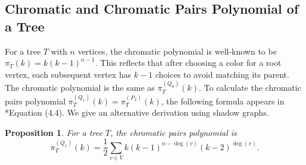 \documentclass[12pt,reqno,dvipsnames]{amsart}
\newtheorem{prop}[theorem]{Proposition}
\theoremstyle{definition}
\begin{document}
\subsection{Chromatic and Chromatic Pairs Polynomial of a Tree}

For a tree $T$ with $n$ vertices, the chromatic polynomial is well-known to be $\pi_T(k) = k(k - 1)^{n - 1}$. This reflects that after choosing a color for a root vertex, each subsequent vertex has $k - 1$ choices to avoid matching its parent. The chromatic polynomial is the same as $\pi_{T}^{(Q_0)}(k)$. To calculate the chromatic pairs polynomial $\pi_{T}^{(Q_1)}(k)=\pi_{T}^{(P_2)}(k)$, the following formula appears in \cite{AKLR25}*{Equation (4.4)}. We give an alternative derivation using shadow graphs.

\begin{prop}
For a tree $T$, the chromatic pairs polynomial is
$$
\pi_T^{(Q_1)}(k) = \frac{1}{2} \sum_{v \in V} k(k - 1)^{n - \deg(v)} (k - 2)^{\deg(v)}.
$$ 
\end{prop}
\end{document}
